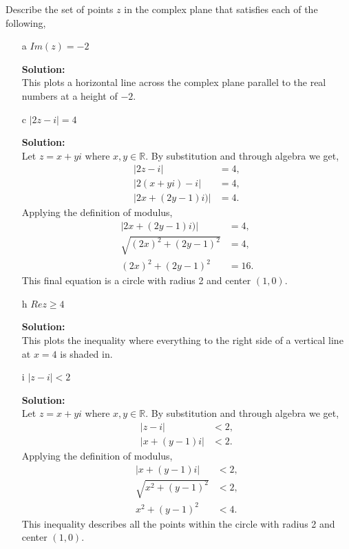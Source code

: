 \documentclass[12pt]{article}
\makeatletter
\theoremstyle{homework}
\newenvironment{exercise}[1]
{\def\@currentlabel{#1}\exercisecore}
{\endexercisecore}
\newcommand{\localhead}[1]{\par\smallskip\noindent\textbf{#1}\nobreak\\}%
\newcommand\solution{\localhead{Solution:}}
\newcommand{\Reals}{\ensuremath{\mathbb R}}
\let\RR\Reals
\makeatother
\begin{document}
\begin{exercise}{7} Describe the set of points $z$ in the complex plane that satisfies each of the following, 
    \begin{enumerate}
        \item[a] $Im(z) = -2$\\
        \solution This plots a horizontal line across the complex plane parallel to the real numbers at a height of $-2$. 
        \vspace{.15in} 
        \item[c] $|2z - i| = 4$\\ 
        \solution Let $z = x + yi$ where $x, y \in \RR$. By substitution and through algebra we get, 
        \begin{align*}
            |2z - i| &= 4,\\
            |2(x + yi) - i| &= 4,\\
            |2x + (2y-1)i)| &= 4.
        \end{align*}
        Applying the definition of modulus, 
        \begin{align*}
            |2x + (2y-1)i)| &= 4,\\
            \sqrt{(2x)^2 + (2y-1)^2} &= 4,\\
            (2x)^2 + (2y-1)^2 &= 16.
        \end{align*}
       This final equation is a circle with radius 2 and center $(1, 0)$. 
        \vspace{.15in} 
        \item[h] $Re z\geq 4$\\
        \solution This plots the inequality where everything to the right side of a vertical line at $x = 4$ is shaded in. 
        \vspace{.15in} 
        \item[i]  $|z - i| < 2$\\
        \solution  Let $z = x + yi$ where $x, y \in \RR$. By substitution and through algebra we get, 
        \begin{align*}
            |z - i| &< 2,\\
            |x + (y-1)i| &< 2.
        \end{align*}
        Applying the definition of modulus, 
        \begin{align*}
            |x + (y-1)i| &< 2,\\
            \sqrt{x^2 + (y-1)^2} &< 2,\\
            x^2 + (y-1)^2 & < 4.
        \end{align*}
        This inequality describes all the points within the circle with radius 2 and center $(1, 0)$. 
    \end{enumerate}
\end{exercise}
\vspace{1in}
\end{document}
